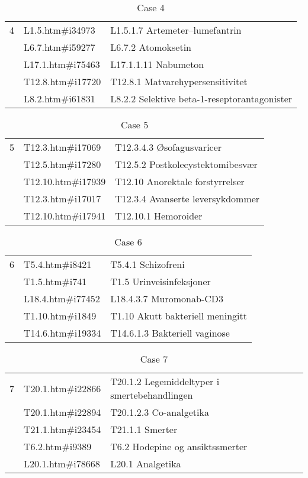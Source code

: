 \begin{table}[htbp]\center
\caption{Case 4}
\begin{tabular}{cll}
\toprule
4 & L1.5.htm\#i34973   & L1.5.1.7 Artemeter–lumefantrin \\
  & L6.7.htm\#i59277   & L6.7.2 Atomoksetin \\
  & L17.1.htm\#i75463  & L17.1.1.11 Nabumeton \\
  & T12.8.htm\#i17720  & T12.8.1 Matvarehypersensitivitet \\
  & L8.2.htm\#i61831   & L8.2.2  Selektive beta-1-reseptorantagonister \\
\bottomrule
\end{tabular}
\end{table}
\begin{table}[htbp]\center
\caption{Case 5}
\begin{tabular}{cll}
\toprule
5 & T12.3.htm\#i17069  & T12.3.4.3 Øsofagusvaricer \\
  & T12.5.htm\#i17280  & T12.5.2 Postkolecystektomibesvær \\
  & T12.10.htm\#i17939 & T12.10 Anorektale forstyrrelser \\
  & T12.3.htm\#i17017  & T12.3.4 Avanserte leversykdommer \\
  & T12.10.htm\#i17941 & T12.10.1 Hemoroider \\
\bottomrule
\end{tabular}
\end{table}
\begin{table}[htbp]\center
\caption{Case 6}
\begin{tabular}{cll}
\toprule
6 & T5.4.htm\#i8421    & T5.4.1 Schizofreni \\
  & T1.5.htm\#i741     & T1.5 Urinveisinfeksjoner \\
  & L18.4.htm\#i77452  & L18.4.3.7 Muromonab-CD3 \\
  & T1.10.htm\#i1849   & T1.10 Akutt bakteriell meningitt \\
  & T14.6.htm\#i19334  & T14.6.1.3 Bakteriell vaginose \\
\bottomrule
\end{tabular}
\end{table}
\begin{table}[htbp]\center
\caption{Case 7}
\begin{tabular}{cll}
\toprule
7 & T20.1.htm\#i22866  & T20.1.2 Legemiddeltyper i smertebehandlingen \\
  & T20.1.htm\#i22894  & T20.1.2.3 Co-analgetika \\
  & T21.1.htm\#i23454  & T21.1.1 Smerter \\
  & T6.2.htm\#i9389    & T6.2 Hodepine og ansiktssmerter \\
  & L20.1.htm\#i78668  & L20.1 Analgetika \\
\bottomrule
\end{tabular}
\end{table}

